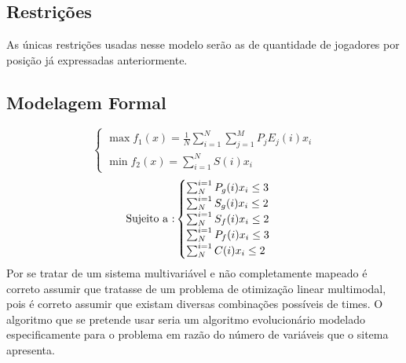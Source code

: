 \subsection{Restrições}
As únicas restrições usadas nesse modelo serão as de quantidade de jogadores por posição já expressadas anteriormente.
\subsection{Modelagem Formal}
\begin{equation}
    \begin{cases} 
        \max f_{1}(x) = \frac{1}{N}\sum_{i=1}^{N}\sum_{j=1}^{M}P_{j}E_{j}(i)x_i \\
        \min f_2(x) = \sum_{i=1}^{N}S(i)x_i
    \end{cases}
\end{equation}
\begin{equation*}
    \text{Sujeito a :} \\
    \begin{cases}
        \sum^{i=1}_{N}P_g(i)x_i \leq 3 \\
        \sum^{i=1}_{N}S_g(i)x_i \leq 2 \\
        \sum^{i=1}_{N}S_f(i)x_i \leq 2 \\
        \sum^{i=1}_{N}P_f(i)x_i \leq 3 \\
        \sum^{i=1}_{N}C(i)x_i \leq 2 
    \end{cases}
\end{equation*}
Por se tratar de um sistema multivariável e não completamente mapeado é correto assumir que tratasse de um problema de otimização linear multimodal, pois é correto assumir
que existam diversas combinações possíveis de times. O algoritmo que se pretende usar seria um algoritmo evolucionário modelado especificamente para 
o problema em razão do número de variáveis que o sitema apresenta.

